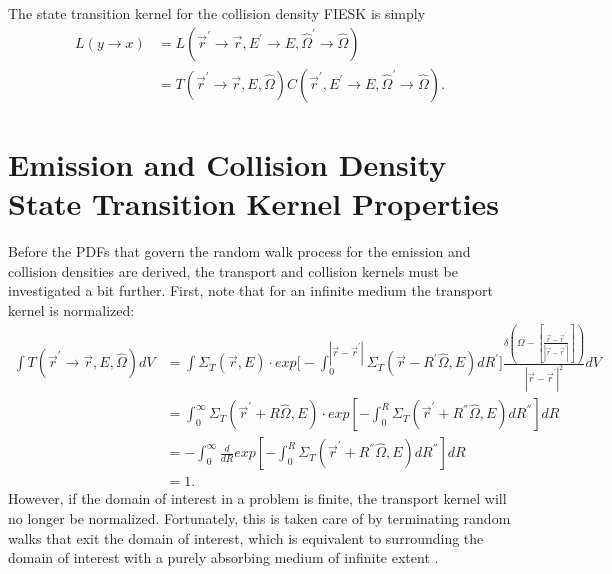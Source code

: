 The state transition kernel for the collision density FIESK is simply
\begin{align}
  L(y \to x) & = 
  L(\vec{r}^{'} \to \vec{r},E^{'} \to E,\hat{\Omega}^{'} \to \hat{\Omega}) 
  \nonumber \\
  & = T(\vec{r}^{'} \to \vec{r},E,\hat{\Omega})
  C(\vec{r}^{'},E^{'} \to E,\hat{\Omega}^{'} \to \hat{\Omega}).
\end{align}

\section{Emission and Collision Density State Transition Kernel Properties}
Before the PDFs that govern the random walk process for the emission and
collision densities are derived, the transport and collision kernels must be 
investigated a bit further. First, note that for an infinite medium the 
transport kernel is normalized:
\begin{align}
  \int T(\vec{r}^{'} \to \vec{r},E,\hat{\Omega})dV & =
    \int \Sigma_T(\vec{r},E)
    \cdot exp\Big[-\int_0^{|\vec{r} - \vec{r}^{'}|} 
      \Sigma_T(\vec{r}-R^{'}\hat{\Omega},E)dR^{'} \Big] 
    \frac{\delta \left(\Omega - \left[\frac{\vec{r} - \vec{r}^{'}}
        {|\vec{r} - \vec{r}^{'}|}\right]\right)}
    {|\vec{r} - \vec{r}^{'}|^2} dV \nonumber \\
  & = \int_0^{\infty} \Sigma_T(\vec{r}^{'}+R\hat{\Omega},E)
  \cdot exp\left[-\int_0^R \Sigma_T(\vec{r}^{'}+R^{''}\hat{\Omega},E)
    dR^{''} \right] dR \nonumber \\
  & = -\int_0^{\infty} \frac{d}{dR} exp\left[-\int_0^R 
    \Sigma_T(\vec{r}^{'}+R^{''}\hat{\Omega},E) dR^{''} \right] dR 
  \nonumber \\
  & = 1. \nonumber
\end{align}
However, if the domain of interest in a problem is finite, the transport kernel 
will no longer be normalized. Fortunately, this is taken care of by terminating 
random walks that exit the domain of interest, which is equivalent to 
surrounding the domain of interest with a purely absorbing medium of infinite 
extent \citep{irving_adjoint_1971}.

